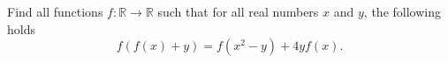 Find all functions $f\colon\mathbb{R} \rightarrow \mathbb{R}$ such that for
all real numbers $x$ and $y$, the following holds
$$f(f(x)+y)=f(x^2-y)+4yf(x).$$